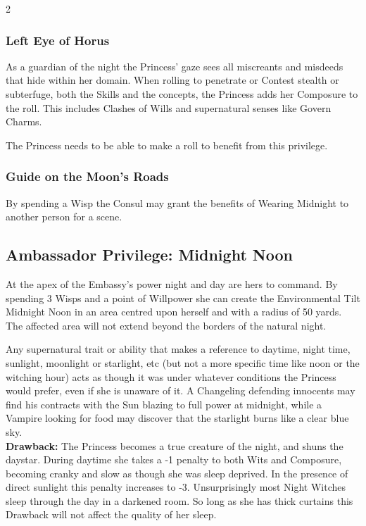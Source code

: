 \begin{multicols}{2}
\subsubsection*{Left Eye of Horus}

As a guardian of the night the Princess’ gaze sees all miscreants and misdeeds that hide within her domain. When rolling to penetrate or Contest stealth or subterfuge, both the Skills and the concepts, the Princess adds her Composure to the roll. This includes Clashes of Wills and supernatural senses like Govern Charms. 

The Princess needs to be able to make a roll to benefit from this privilege. 

\subsubsection*{Guide on the Moon’s Roads}

By spending a Wisp the Consul may grant the benefits of Wearing Midnight to another person for a scene. 

\subsection*{Ambassador Privilege: Midnight Noon}

At the apex of the Embassy’s power night and day are hers to command. By spending 3 Wisps and a point of Willpower she can create the Environmental Tilt Midnight Noon in an area centred upon herself and with a radius of 50 yards. The affected area will not extend beyond the borders of the natural night. 

Any supernatural trait or ability that makes a reference to daytime, night time, sunlight, moonlight or starlight, etc (but not a more specific time like noon or the witching hour) acts as though it was under whatever conditions the Princess would prefer, even if she is unaware of it. A Changeling defending innocents may find his contracts with the Sun blazing to full power at midnight, while a Vampire looking for food may discover that the starlight burns like a clear blue sky. \\

\noindent \textbf{Drawback:} The Princess becomes a true creature of the night, and shuns the daystar. During daytime she takes a -1 penalty to both Wits and Composure, becoming cranky and slow as though she was sleep deprived. In the presence of direct sunlight this penalty increases to -3. Unsurprisingly most Night Witches sleep through the day in a darkened room. So long as she has thick curtains this Drawback will not affect the quality of her sleep.



\end{multicols}

